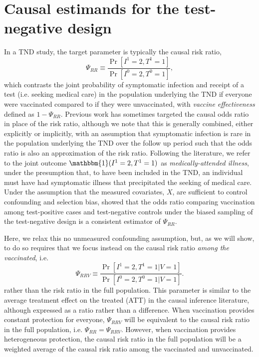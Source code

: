 \documentclass[11pt]{article}
\begin{document}
\section{Causal estimands for the test-negative design} \label{sec:estimands}
In a TND study, the target parameter is typically the causal risk ratio,
\begin{equation*}
    \Psi_{RR} \equiv \dfrac{\Pr[I^1 = 2, T^1 = 1]}{\Pr[I^0 = 2, T^0 = 1]},
\end{equation*}
which contrasts the joint probability of symptomatic infection and receipt of a test (i.e. seeking medical care) in the population underlying the TND if everyone were vaccinated compared to if they were unvaccinated, with \textit{vaccine effectiveness} defined as $1 - \Psi_{RR}$. Previous work has sometimes targeted the causal odds ratio in place of the risk ratio, although we note that this is generally combined, either explicitly or implicitly, with an assumption that symptomatic infection is rare in the population underlying the TND over the follow up period such that the odds ratio is also an approximation of the risk ratio. Following the literature, we refer to the joint outcome $\mathbbm{1}(I^1 = 2, T^1 = 1)$ as \textit{medically-attended illness}, under the presumption that, to have been included in the TND, an individual must have had symptomatic illness that precipitated the seeking of medical care. Under the assumption that the measured covariates, $X$, are sufficient to control confounding and selection bias,  \cite{schnitzer_estimands_2022} showed that the odds ratio comparing vaccination among test-positive cases and test-negative controls under the biased sampling of the test-negative design is a consistent estimator of $\Psi_{RR}$. 

Here, we relax this no unmeasured confounding assumption, but, as we will show, to do so requires that we focus instead on the causal risk ratio \textit{among the vaccinated}, i.e.
\begin{equation*}
    \Psi_{RRV} \equiv \dfrac{\Pr[I^1 = 2, T^1 =1 | V = 1]}{\Pr[I^0 = 2, T^0 =1 | V = 1]} .
\end{equation*}
rather than the risk ratio in the full population. This parameter is similar to the average treatment effect on the treated (ATT) in the causal inference literature, although expressed as a ratio rather than a difference. When vaccination provides constant protection for everyone, $\Psi_{RRV}$ will be equivalent to the causal risk ratio in the full population, i.e. $\Psi_{RR} = \Psi_{RRV}$. However, when vaccination provides heterogeneous protection, the causal risk ratio in the full population will be a weighted average of the causal risk ratio among the vaccinated and unvaccinated.
\end{document}
